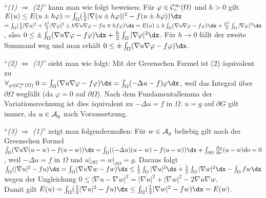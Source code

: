 \begin{Bem}
    "`\emph{(1)} $\Rightarrow$ \emph{(2)}"' kann man wie folgt beweisen:
    Für $\varphi \in \mathcal{C}^\infty_c(\Omega)$ und $h > 0$ gilt\\
    $E(u) \le E(u \pm h\varphi)
    = \int_\Omega (\frac{1}{2} |\nabla (u \pm h\varphi)|^2 - f(u \pm h\varphi)) \dx$\\
    $= \int_\Omega (\frac{1}{2} |\nabla u|^2 + \frac{h^2}{2} |\nabla \varphi|^2 \pm
    h \nabla u \nabla \varphi - fu \mp h f\varphi) \dx
    = E(u) \pm h \int_\Omega (\nabla u \nabla \varphi - f\varphi) \dx +
    \frac{h^2}{2} \int_\Omega |\nabla \varphi|^2 \dx$,
    also $0 \le \pm\int_\Omega (\nabla u \nabla \varphi - f\varphi) \dx +
    \frac{h}{2} \int_\Omega |\nabla \varphi|^2 \dx$.
    Für $h \to 0$ fällt der zweite Summand weg und man erhält
    $0 \le \pm\int_\Omega (\nabla u \nabla \varphi - f\varphi) \dx$.

    "`\emph{(2)} $\iff$ \emph{(3)}"' sieht man wie folgt:
    Mit der Greenschen Formel ist (2) äquivalent zu\\
    $\forall_{\varphi \in \C^\infty_c(\Omega)}\;
    0 = \int_\Omega (\nabla u \nabla \varphi - f\varphi) \dx
    = \int_\Omega (-\Delta u - f) \varphi \dx$, weil das Integral über $\partial \Omega$
    wegfällt (da $\varphi = 0$ auf $\partial \Omega$).
    Nach dem Fundamentallemma der Variationsrechnung ist dies äquivalent zu $-\Delta u = f$
    in $\Omega$.
    $u = g$ auf $\partial G$ gilt immer, da $u \in \mathcal{A}_g$ nach Voraussetzung.

    "`\emph{(3)} $\Rightarrow$ \emph{(1)}"' zeigt man folgendermaßen:
    Für $w \in \mathcal{A}_g$ beliebig gilt nach der Greenschen Formel
    $\int_\Omega (\nabla u \nabla (u - w) - f(u - w))\dx
    = \int_\Omega ((-\Delta u)(u - w) - f(u - w)) \dx +
    \int_{\partial\Omega} \frac{\partial u}{\partial \nu} (u - w) do = 0$,
    weil $-\Delta u = f$ in $\Omega$ und $u|_{\partial\Omega} = w|_{\partial\Omega} = g$.
    Daraus folgt\\
    $\int_\Omega (|\nabla u|^2 - fu) \dx
    = \int_\Omega (\nabla u \nabla w - fw) \dx
    \le \frac{1}{2} \int_\Omega |\nabla u|^2 \dx + \frac{1}{2} \int_\Omega |\nabla w|^2 \dx -
    \int_\Omega fw \dx$ wegen der Ungleichung
    $0 \le |\nabla u - \nabla w|^2 = |\nabla u|^2 + |\nabla w|^2 - 2 \nabla u \nabla w$.\\
    Damit gilt
    $E(u) = \int_\Omega (\frac{1}{2} |\nabla u|^2 - fu) \dx \le
    \int_\Omega (\frac{1}{2} |\nabla w|^2 - fw) \dx = E(w)$.
\end{Bem}


